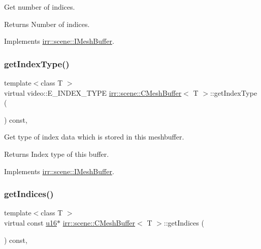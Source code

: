 Get number of indices. 

\begin{DoxyReturn}{Returns}
Number of indices. 
\end{DoxyReturn}


Implements \hyperlink{classirr_1_1scene_1_1IMeshBuffer_a96e08662e15b1205516b87ada3301551}{irr\+::scene\+::\+I\+Mesh\+Buffer}.

\mbox{\label{classirr_1_1scene_1_1CMeshBuffer_aa183491690fa47b4697bbfcc7902301c}} 
\subsubsection{\texorpdfstring{get\+Index\+Type()}{getIndexType()}}
{\footnotesize\ttfamily template$<$class T $>$ \\
virtual video\+::\+E\+\_\+\+I\+N\+D\+E\+X\+\_\+\+T\+Y\+PE \hyperlink{classirr_1_1scene_1_1CMeshBuffer}{irr\+::scene\+::\+C\+Mesh\+Buffer}$<$ T $>$\+::get\+Index\+Type (\begin{DoxyParamCaption}{ }\end{DoxyParamCaption}) const\hspace{0.3cm}{\ttfamily [inline]}, {\ttfamily [virtual]}}



Get type of index data which is stored in this meshbuffer. 

\begin{DoxyReturn}{Returns}
Index type of this buffer. 
\end{DoxyReturn}


Implements \hyperlink{classirr_1_1scene_1_1IMeshBuffer_a8a993431c2c35420b62a577dc18dbdc2}{irr\+::scene\+::\+I\+Mesh\+Buffer}.

\mbox{\label{classirr_1_1scene_1_1CMeshBuffer_a23af7e8ffb2ba674d1dd4448cea288bf}} 
\subsubsection{\texorpdfstring{get\+Indices()}{getIndices()}\hspace{0.1cm}{\footnotesize\ttfamily [1/2]}}
{\footnotesize\ttfamily template$<$class T $>$ \\
virtual const \hyperlink{namespaceirr_ae9f8ec82692ad3b83c21f555bfa70bcc}{u16}$\ast$ \hyperlink{classirr_1_1scene_1_1CMeshBuffer}{irr\+::scene\+::\+C\+Mesh\+Buffer}$<$ T $>$\+::get\+Indices (\begin{DoxyParamCaption}{ }\end{DoxyParamCaption}) const\hspace{0.3cm}{\ttfamily [inline]}, {\ttfamily [virtual]}}



